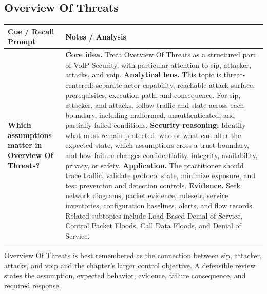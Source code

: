 \documentclass[11pt]{article}
\newcommand{\CornellHeader}{%
\rowcolor{Navy}\color{white}\bfseries Cue / Recall Prompt & \color{white}\bfseries Notes / Analysis\\\hline}
\newcommand{\CornellRow}[2]{%
\cellcolor{CueGray}\RaggedRight\textbf{#1} & \RaggedRight #2\\\hline}
\begin{document}
\subsection*{Overview Of Threats}
\begin{longtable}{>{\RaggedRight\arraybackslash}p{}|>{\RaggedRight\arraybackslash}p{}}
\CornellHeader
\CornellRow{Which assumptions matter in Overview Of Threats?}{\textbf{Core idea.} Treat Overview Of Threats as a structured part of VoIP Security, with particular attention to sip, attacker, attacks, and voip. \textbf{Analytical lens.} This topic is threat-centered: separate actor capability, reachable attack surface, prerequisites, execution path, and consequence. For sip, attacker, and attacks, follow traffic and state across each boundary, including malformed, unauthenticated, and partially failed conditions. \textbf{Security reasoning.} Identify what must remain protected, who or what can alter the expected state, which assumptions cross a trust boundary, and how failure changes confidentiality, integrity, availability, privacy, or safety. \textbf{Application.} The practitioner should trace traffic, validate protocol state, minimize exposure, and test prevention and detection controls. \textbf{Evidence.} Seek network diagrams, packet evidence, rulesets, service inventories, configuration baselines, alerts, and flow records. Related subtopics include Load-Based Denial of Service, Control Packet Floods, Call Data Floods, and Denial of Service.}
\end{longtable}
\begin{topicsummary}
Overview Of Threats is best remembered as the connection between sip, attacker, attacks, and voip and the chapter's larger control objective. A defensible review states the assumption, expected behavior, evidence, failure consequence, and required response.
\end{topicsummary}
\end{document}
